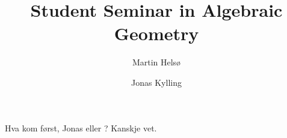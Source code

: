 \documentclass[a4paper, UKenglish]{report}
\title
{
    \bfseries\sffamily
    Student Seminar in Algebraic Geometry
}
\author
{
    Martin Hels\o
    \and
    Jonas Kylling
}
\begin{document}
\begin{titlepage}
    \maketitle
\end{titlepage}

\noindent Hva kom først, Jonas eller \kern-7pt \egg ? Kanskje \cite{Huy06} vet.

\clearpage
\printbibliography
\end{document}
